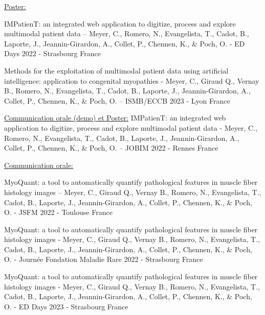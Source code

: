 \underline{Poster:} 

IMPatienT: an integrated web application to digitize, process and explore multimodal patient data – Meyer, C., Romero, N., Evangelista, T., Cadot, B., Laporte, J., Jeannin-Girardon, A., Collet, P., Chennen, K., \& Poch, O. - ED Days 2022 - Strasbourg France

Methods for the exploitation of multimodal patient data using artificial intelligence: application to congenital myopathies - Meyer, C., Giraud Q., Vernay B., Romero, N., Evangelista, T., Cadot, B., Laporte, J., Jeannin-Girardon, A., Collet, P., Chennen, K., \& Poch, O. – ISMB/ECCB 2023 - Lyon France

\underline{Communication orale (demo) et Poster:} IMPatienT: an integrated web application to digitize, process and explore multimodal patient data - Meyer, C., Romero, N., Evangelista, T., Cadot, B., Laporte, J., Jeannin-Girardon, A., Collet, P., Chennen, K., \& Poch, O. – JOBIM 2022 - Rennes France

\underline{Communication orale:}

MyoQuant: a tool to automatically quantify pathological features in muscle fiber histology images – Meyer, C., Giraud Q., Vernay B., Romero, N., Evangelista, T., Cadot, B., Laporte, J., Jeannin-Girardon, A., Collet, P., Chennen, K., \& Poch, O. - JSFM 2022 - Toulouse France

MyoQuant: a tool to automatically quantify pathological features in muscle fiber histology images - Meyer, C., Giraud Q., Vernay B., Romero, N., Evangelista, T., Cadot, B., Laporte, J., Jeannin-Girardon, A., Collet, P., Chennen, K., \& Poch, O. - Journée Fondation Maladie Rare 2022 - Strasbourg France

MyoQuant: a tool to automatically quantify pathological features in muscle fiber histology images - Meyer, C., Giraud Q., Vernay B., Romero, N., Evangelista, T., Cadot, B., Laporte, J., Jeannin-Girardon, A., Collet, P., Chennen, K., \& Poch, O. - ED Days 2023 - Strasbourg France
